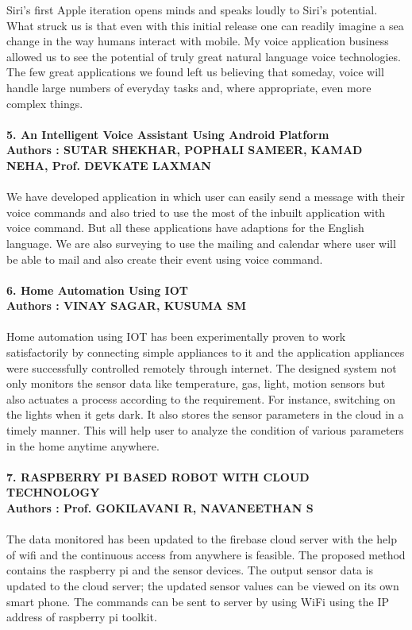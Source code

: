 \documentclass[12pt]{extreport}
\begin{document}
Siri's first Apple iteration opens minds and speaks loudly to Siri's potential. What struck us is that even with this initial release one can readily imagine a sea change in the way humans interact with mobile. My voice application business allowed us to see the potential of truly great natural language voice technologies. The few great applications we found left us believing that someday, voice will handle large numbers of everyday tasks and, where appropriate, even more complex things.\\\\
\textbf{5. An Intelligent Voice Assistant Using Android Platform}\\\textbf{Authors : SUTAR SHEKHAR, POPHALI SAMEER, KAMAD NEHA, Prof. DEVKATE LAXMAN}\\\\
We have developed application in which user can easily send a message with their voice commands and also tried to use the most of the inbuilt application with voice command. But all these applications have adaptions for the English language. We are also surveying to use the mailing and calendar where user will be able to mail and also create their event using voice command.\\\\
\textbf{6. Home Automation Using IOT}\\
\textbf{Authors : VINAY SAGAR, KUSUMA SM}\\\\
Home automation using IOT has been experimentally proven to work satisfactorily by connecting simple appliances to it and the application appliances were successfully controlled remotely through internet. The designed system not only monitors the sensor data like temperature, gas, light, motion sensors but also actuates a process according to the requirement. For instance, switching on the lights when it gets dark. It also stores the sensor parameters in the cloud in a timely manner. This will help user to analyze the condition of various parameters in the home anytime anywhere.\\\\
\textbf{7. RASPBERRY PI BASED ROBOT WITH CLOUD TECHNOLOGY}\\
\textbf{Authors :  Prof. GOKILAVANI R, NAVANEETHAN S}\\\\
The data monitored has been updated to the firebase cloud server with the help of wifi and the continuous access from anywhere is feasible. The proposed method contains the raspberry pi and the sensor devices. The output sensor data is updated to the cloud server; the updated sensor values can be viewed on its own smart phone. The commands can be sent to server by using WiFi using the IP address of raspberry pi toolkit.\\\\
\end{document}
